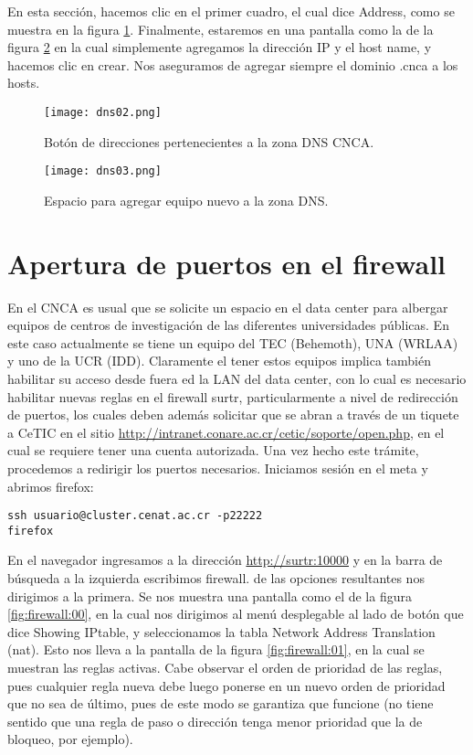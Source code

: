 En esta sección, hacemos clic en el primer cuadro, el cual dice Address, como se muestra en la figura \ref{fig:dns:02}. Finalmente, estaremos en una pantalla como la de la figura \ref{fig:dns:03} en la cual simplemente agregamos la dirección IP y el host name, y hacemos clic en crear. Nos aseguramos de agregar siempre el dominio .cnca a los hosts.

\begin{figure}[H]
\centering
\texttt{[image: dns02.png]}
\caption{Botón de direcciones pertenecientes a la zona DNS CNCA.}
\label{fig:dns:02}
\end{figure}

\begin{figure}[H]
\centering
\texttt{[image: dns03.png]}
\caption{Espacio para agregar equipo nuevo a la zona DNS.}
\label{fig:dns:03}
\end{figure}

\section{Apertura de puertos en el firewall}
En el CNCA es usual que se solicite un espacio en el data center para albergar equipos de centros de investigación de las diferentes universidades públicas. En este caso actualmente se tiene un equipo del TEC (Behemoth), UNA (WRLAA) y uno de la UCR (IDD). Claramente el tener estos equipos implica también habilitar su acceso desde fuera ed la LAN del data center, con lo cual es necesario habilitar nuevas reglas en el firewall surtr, particularmente a nivel de redirección de puertos, los cuales deben además solicitar que se abran a través de un tiquete a CeTIC en el sitio \url{http://intranet.conare.ac.cr/cetic/soporte/open.php}, en el cual se requiere tener una cuenta autorizada. Una vez hecho este trámite, procedemos a redirigir los puertos necesarios. Iniciamos sesión en el meta y abrimos firefox:

\begin{lstlisting}
ssh usuario@cluster.cenat.ac.cr -p22222
firefox
\end{lstlisting}

En el navegador ingresamos a la dirección \url{http://surtr:10000} y en la barra de búsqueda a la izquierda escribimos firewall. de las opciones resultantes nos dirigimos a la primera. Se nos muestra una pantalla como el de la figura \ref{fig:firewall:00}, en la cual nos dirigimos al menú desplegable al lado de botón que dice Showing IPtable, y seleccionamos la tabla Network Address Translation (nat). Esto nos lleva a la pantalla de la figura \ref{fig:firewall:01}, en la cual se muestran las reglas activas. Cabe observar el orden de prioridad de las reglas, pues cualquier regla nueva debe luego ponerse en un nuevo orden de prioridad que no sea de último, pues de este modo se garantiza que funcione (no tiene sentido que una regla de paso o dirección tenga menor prioridad que la de bloqueo, por ejemplo). 

